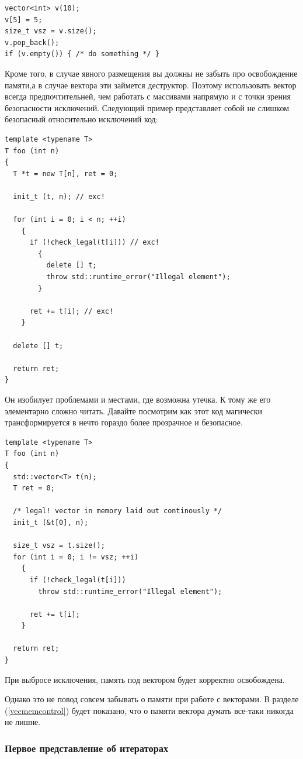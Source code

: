 \documentclass[a4paper,12pt,oneside]{article}
\begin{document}
\begin{lstlisting}
vector<int> v(10);
v[5] = 5;
size_t vsz = v.size();
v.pop_back();
if (v.empty()) { /* do something */ }
\end{lstlisting}

Кроме того, в случае явного размещения вы должны не забыть про освобождение памяти,а  в случае вектора эти займется деструктор. Поэтому использовать вектор всегда предпочтительней, чем работать с массивами напрямую и с точки зрения безопасности исключений. Следующий пример представляет собой не слишком безопасный относительно исключений код:

\begin{lstlisting}
template <typename T>
T foo (int n)
{
  T *t = new T[n], ret = 0;

  init_t (t, n); // exc!
  
  for (int i = 0; i < n; ++i)
    {
      if (!check_legal(t[i])) // exc!
        {
          delete [] t;
          throw std::runtime_error("Illegal element");
        }

      ret += t[i]; // exc!
    }

  delete [] t;

  return ret;
}
\end{lstlisting}

Он изобилует проблемами и местами, где возможна утечка. К тому же его элементарно сложно читать. Давайте посмотрим как этот код магически трансформируется в нечто гораздо более прозрачное и безопасное.

\begin{lstlisting}
template <typename T>
T foo (int n)
{
  std::vector<T> t(n);
  T ret = 0;

  /* legal! vector in memory laid out continously */
  init_t (&t[0], n); 

  size_t vsz = t.size();
  for (int i = 0; i != vsz; ++i)
    {
      if (!check_legal(t[i]))
        throw std::runtime_error("Illegal element");

      ret += t[i];
    }

  return ret;
}
\end{lstlisting}

При выбросе исключения, память под вектором будет корректно освобождена.

Однако это не повод совсем забывать о памяти при работе с векторами. В разделе (\ref{vecmemcontrol}) будет показано, что о памяти вектора думать все-таки никогда не лишне.

\subsubsection{Первое представление об итераторах}
\end{document}
